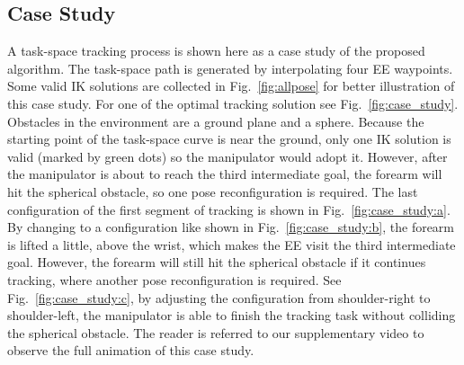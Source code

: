 \documentclass[letterpaper, 10 pt, conference]{ieeeconf}  %
\begin{document}
\subsection{Case Study}\label{section:case_study}


A task-space tracking process is shown here as a case study of the proposed algorithm. 
The task-space path is generated by interpolating four EE waypoints. 
Some valid IK solutions are collected in Fig.~\ref{fig:allpose} for better illustration of this case study. 
For one of the optimal tracking solution see Fig.~\ref{fig:case_study}. 
Obstacles in the environment are a ground plane and a sphere. 
Because the starting point of the task-space curve is near the ground, only one IK solution is valid (marked by green dots) so the manipulator would adopt it. 
However, after the manipulator is about to reach the third intermediate goal, the forearm will hit the spherical obstacle, so one pose reconfiguration is required. 
The last configuration of the first segment of tracking is shown in Fig.~\ref{fig:case_study:a}. 
By changing to a configuration like shown in Fig.~\ref{fig:case_study:b}, the forearm is lifted a little, above the wrist, which makes the EE visit the third intermediate goal. However, the forearm will still hit the spherical obstacle if it continues tracking, where another pose reconfiguration is required. 
See Fig.~\ref{fig:case_study:c}, by adjusting the configuration from shoulder-right to shoulder-left, the manipulator is able to finish the tracking task without colliding the spherical obstacle.
The reader is referred to our supplementary video to observe the full animation of this case study. 

\end{document}
